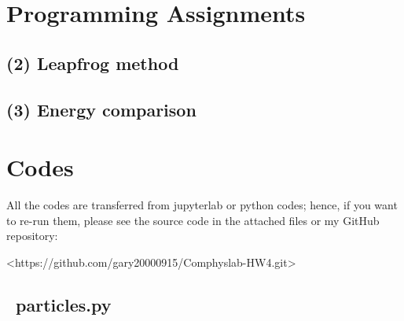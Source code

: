 \documentclass[12pt]{article}
\begin{document}
    \section{Programming Assignments}
    \subsection{(2) Leapfrog method}


    \subsection{(3) Energy comparison}


\section{Codes}
    All the codes are transferred from jupyterlab or python codes; hence, if you want to re-run them, please see the source code in the attached files or my GitHub repository: \newline
    {\centerline{\ttfamily <https://github.com/gary20000915/Comphyslab-HW4.git>}}

    \subsection{{\ttfamily\ particles.py}}
        \begin{lstlisting}[language={Python}]
        
        \end{lstlisting}
\end{document}
